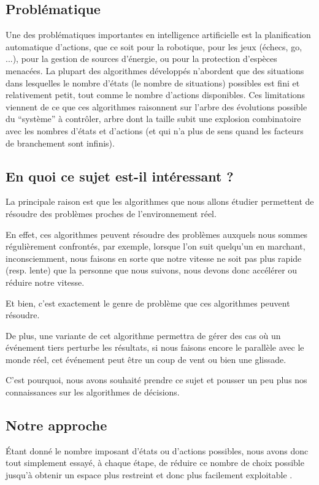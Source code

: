 \documentclass[pdftex,french, english]{article}	%
\begin{document}
	\subsection{Problématique}
	Une des problématiques importantes en intelligence artificielle est la planification automatique d’actions, que ce soit pour la robotique, pour les jeux (échecs, go, ...), pour la gestion de sources d’énergie, ou pour la protection d’espèces menacées. La plupart des algorithmes développés n’abordent que des situations dans lesquelles le nombre d’états (le nombre de situations) possibles est fini et relativement petit, tout comme le nombre d’actions disponibles. Ces limitations viennent de ce que ces algorithmes raisonnent sur l’arbre des évolutions possible du “système” à contrôler, arbre dont la taille subit une explosion combinatoire avec les nombres d’états et d’actions (et qui n’a plus de sens quand les facteurs de branchement sont infinis).
	\subsection{En quoi ce sujet est-il intéressant ?}

	La principale raison est que les algorithmes que nous allons étudier permettent de résoudre des problèmes proches de l'environnement réel.

	En effet, ces algorithmes peuvent résoudre des problèmes auxquels nous sommes régulièrement confrontés, par exemple, lorsque l'on suit quelqu'un en marchant, inconsciemment, nous faisons en sorte que notre vitesse ne soit pas plus rapide (resp. lente) que la personne que nous suivons, nous devons donc accélérer ou réduire notre vitesse.

	Et bien, c'est exactement le genre de problème que ces algorithmes peuvent résoudre.

	De plus, une variante de cet algorithme permettra de gérer des cas où un événement tiers perturbe les résultats, si nous faisons encore le parallèle avec le monde réel, cet événement peut être un coup de vent ou bien une glissade.

	C'est pourquoi, nous avons souhaité prendre ce sujet et pousser un peu plus nos connaissances sur les algorithmes de décisions.
	
	\subsection{Notre approche}
	Étant donné le nombre imposant d'états ou d'actions possibles, nous avons donc tout simplement essayé, à chaque étape, de réduire ce nombre de choix possible jusqu'à obtenir un espace plus restreint et donc plus facilement exploitable \cite{couetoux01}.
\end{document}
